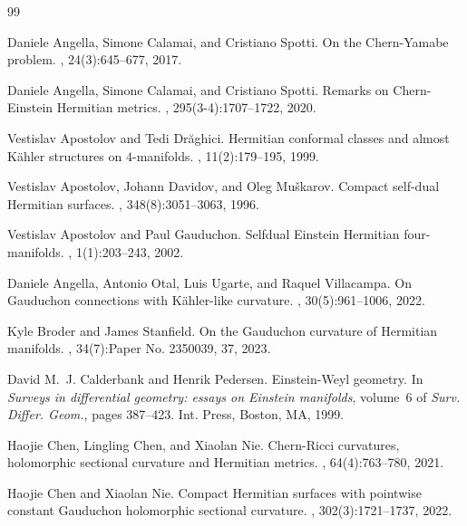\documentclass[12pt]{amsart}
\theoremstyle{plain}
\theoremstyle{definition}
\renewcommand{\>}{\rightarrow}
\numberwithin{equation}{section} %
\begin{document}
	
\begin{thebibliography}{99}
	
	Daniele Angella, Simone Calamai, and Cristiano Spotti.
	\newblock On the {C}hern-{Y}amabe problem.
	, 24(3):645--677, 2017.
	
	Daniele Angella, Simone Calamai, and Cristiano Spotti.
	\newblock Remarks on {C}hern-{E}instein {H}ermitian metrics.
	, 295(3-4):1707--1722, 2020.
	
	Vestislav Apostolov and Tedi Dr\u{a}ghici.
	\newblock Hermitian conformal classes and almost {K}\"{a}hler structures on
	{$4$}-manifolds.
	, 11(2):179--195, 1999.
	
	Vestislav Apostolov, Johann Davidov, and Oleg Mu\v{s}karov.
	\newblock Compact self-dual {H}ermitian surfaces.
	, 348(8):3051--3063, 1996.
	
	Vestislav Apostolov and Paul Gauduchon.
	\newblock Selfdual {E}instein {H}ermitian four-manifolds.
	, 1(1):203--243, 2002.
	
	Daniele Angella, Antonio Otal, Luis Ugarte, and Raquel Villacampa.
	\newblock On {G}auduchon connections with {K}\"{a}hler-like curvature.
	, 30(5):961--1006, 2022.
	
	Kyle Broder and James Stanfield.
	\newblock On the {G}auduchon curvature of {H}ermitian manifolds.
	, 34(7):Paper No. 2350039, 37, 2023.
	
	David M.~J. Calderbank and Henrik Pedersen.
	\newblock Einstein-{W}eyl geometry.
	\newblock In {\em Surveys in differential geometry: essays on {E}instein
		manifolds}, volume~6 of {\em Surv. Differ. Geom.}, pages 387--423. Int.
	Press, Boston, MA, 1999.
	
	
	Haojie Chen, Lingling Chen, and Xiaolan Nie.
	\newblock Chern-{R}icci curvatures, holomorphic sectional curvature and
	{H}ermitian metrics.
	, 64(4):763--780, 2021.
	
	Haojie Chen and Xiaolan Nie.
	\newblock Compact {H}ermitian surfaces with pointwise constant {G}auduchon
	holomorphic sectional curvature.
	, 302(3):1721--1737, 2022.
	


\end{thebibliography}
\end{document}
